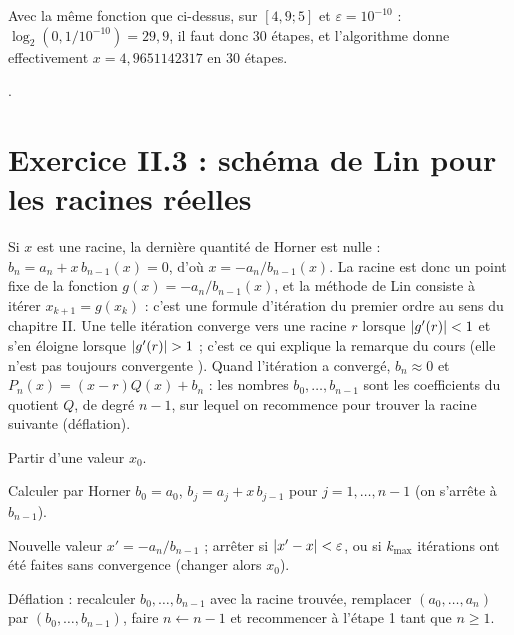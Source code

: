 \Verif Avec la même fonction que ci-dessus, sur $[4{,}9 ; 5]$ et
$\varepsilon = 10^{-10}$ : $\log_2(0{,}1/10^{-10}) = 29{,}9$, il faut donc 30
étapes, et l'algorithme donne effectivement $x = 4{,}9651142317$ en 30 étapes.

\Refs {}.

\section{Exercice II.3 : schéma de Lin pour les racines réelles}


\Pourquoi Si $x$ est une racine, la dernière quantité de Horner est nulle :
$b_n = a_n + x\,b_{n-1}(x) = 0$, d'où $x = -a_n/b_{n-1}(x)$. La racine est donc
un point fixe de la fonction $g(x) = -a_n/b_{n-1}(x)$, et la méthode de Lin
consiste à itérer $x_{k+1} = g(x_k)$ : c'est une formule d'itération du premier
ordre au sens du chapitre II. Une telle itération converge vers une racine $r$
lorsque $\left|g'(r)\right| < 1$ et s'en éloigne lorsque $\left|g'(r)\right| > 1$ ; c'est ce
qui explique la remarque du cours (\og elle n'est pas toujours convergente \fg).
Quand l'itération a convergé, $b_n \approx 0$ et
$P_n(x) = (x - r)Q(x) + b_n$ : les nombres $b_0, \dots, b_{n-1}$ sont les
coefficients du quotient $Q$, de degré $n-1$, sur lequel on recommence pour
trouver la racine suivante (déflation).

\Etapes
{} Partir d'une valeur $x_0$.

 Calculer par Horner $b_0 = a_0$, $b_j = a_j + x\,b_{j-1}$ pour
$j = 1, \dots, n-1$ (on s'arrête à $b_{n-1}$).

 Nouvelle valeur $x' = -a_n/b_{n-1}$ ; arrêter si
$\left|x' - x\right| < \varepsilon$, ou si $k_{\max}$ itérations ont été faites sans
convergence (changer alors $x_0$).

 Déflation : recalculer $b_0, \dots, b_{n-1}$ avec la racine trouvée,
remplacer $(a_0, \dots, a_n)$ par $(b_0, \dots, b_{n-1})$, faire $n \leftarrow
n-1$ et recommencer à l'étape 1 tant que $n \ge 1$.

